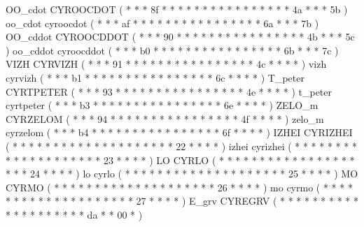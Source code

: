 \makeCOD OO_cdot      CYROOCDOT         ( *  *       *  8f  *  *  *  *     *  *  *  *  *     *  *  *  *     *  *  *     4a  *  *    *  5b  )
\makecod oo_cdot      cyroocdot         ( *  *       *  af  *  *  *  *     *  *  *  *  *     *  *  *  *     *  *  *     6a  *  *    *  7b  )
\makeCOD OO_cddot     CYROOCDDOT        ( *  *       *  90  *  *  *  *     *  *  *  *  *     *  *  *  *     *  *  *     4b  *  *    *  5c  )
\makecod oo_cddot     cyroocddot        ( *  *       *  b0  *  *  *  *     *  *  *  *  *     *  *  *  *     *  *  *     6b  *  *    *  7c  )
\makeCOD VIZH         CYRVIZH           ( *  *       *  91  *  *  *  *     *  *  *  *  *     *  *  *  *     *  *  *     4c  *  *    *  *   )
\makecod vizh         cyrvizh           ( *  *       *  b1  *  *  *  *     *  *  *  *  *     *  *  *  *     *  *  *     6c  *  *    *  *   )
\makeCOD T_peter      CYRTPETER         ( *  *       *  93  *  *  *  *     *  *  *  *  *     *  *  *  *     *  *  *     4e  *  *    *  *   )
\makecod t_peter      cyrtpeter         ( *  *       *  b3  *  *  *  *     *  *  *  *  *     *  *  *  *     *  *  *     6e  *  *    *  *   )
\makeCOD ZELO_m       CYRZELOM          ( *  *       *  94  *  *  *  *     *  *  *  *  *     *  *  *  *     *  *  *     4f  *  *    *  *   )
\makecod zelo_m       cyrzelom          ( *  *       *  b4  *  *  *  *     *  *  *  *  *     *  *  *  *     *  *  *     6f  *  *    *  *   )
\makeCOD IZHEI        CYRIZHEI          ( *  *       *  *   *  *  *  *     *  *  *  *  *     *  *  *  *     *  *  *     22  *  *    *  *   )
\makecod izhei        cyrizhei          ( *  *       *  *   *  *  *  *     *  *  *  *  *     *  *  *  *     *  *  *     23  *  *    *  *   )
\makeCOD LO           CYRLO             ( *  *       *  *   *  *  *  *     *  *  *  *  *     *  *  *  *     *  *  *     24  *  *    *  *   )
\makecod lo           cyrlo             ( *  *       *  *   *  *  *  *     *  *  *  *  *     *  *  *  *     *  *  *     25  *  *    *  *   )
\makeCOD MO           CYRMO             ( *  *       *  *   *  *  *  *     *  *  *  *  *     *  *  *  *     *  *  *     26  *  *    *  *   )
\makecod mo           cyrmo             ( *  *       *  *   *  *  *  *     *  *  *  *  *     *  *  *  *     *  *  *     27  *  *    *  *   )
%
\makeCOD E_grv        CYREGRV           ( *  *       *  *   *  *  *  *     *  *  *  *  *     *  *  *  *     *  *  *     da  *  *    00 *   )
